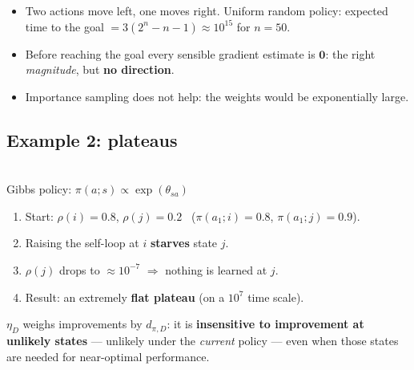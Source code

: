 \begin{itemize}
  \item Two actions move left, one moves right. Uniform random policy: expected time to the goal $= 3(2^n-n-1)\approx10^{15}$ for $n=50$.
  \item Before reaching the goal every sensible gradient estimate is $\mathbf 0$: the right \emph{magnitude}, but \textbf{no direction}.
  \item Importance sampling does not help: the weights would be exponentially large.
\end{itemize}

\subsection{Example 2: plateaus}

\begin{minipage}[c]{0.36\linewidth}
\centering
{}\\
{\scriptsize Gibbs policy: $\pi(a;s)\propto\exp(\theta_{sa})$}
\end{minipage}\hfill
\begin{minipage}[c]{0.6\linewidth}
\begin{enumerate}
  \item Start: $\rho(i)=0.8$, $\rho(j)=0.2$ \ ($\pi(a_1;i)=0.8$, $\pi(a_1;j)=0.9$).
  \item Raising the self-loop at $i$ \textbf{starves} state $j$.
  \item $\rho(j)$ drops to $\approx10^{-7}$ $\Rightarrow$ nothing is learned at $j$.
  \item Result: an extremely \textbf{flat plateau} (on a $10^7$ time scale).
\end{enumerate}
\end{minipage}

\begin{warnbox}[title={Root cause}]
$\eta_D$ weighs improvements by $d_{\pi,D}$: it is \textbf{insensitive to improvement at unlikely states} --- unlikely under the \emph{current} policy --- even when those states are needed for near-optimal performance.
\end{warnbox}

